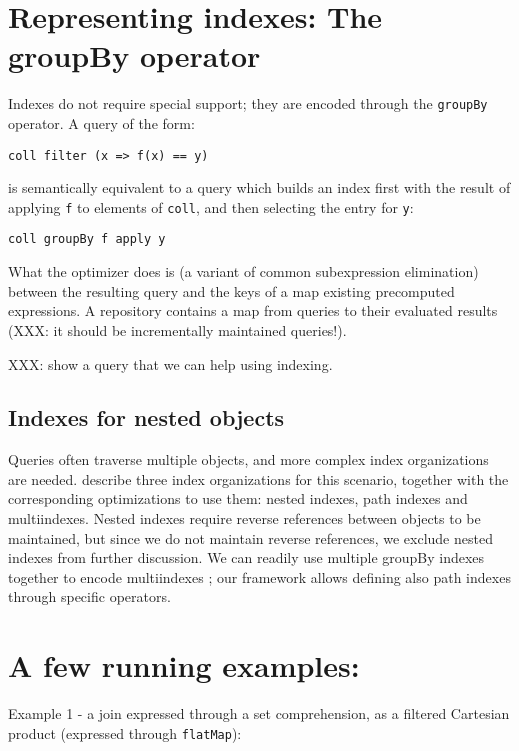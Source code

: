 \documentclass[preprint,authoryear,10pt]{sigplanconf}
\begin{document}
\section{Representing indexes: The groupBy operator}

Indexes do not require special support; they are encoded through the
\texttt{groupBy} operator. A query of the form:

\begin{verbatim}
coll filter (x => f(x) == y)
\end{verbatim}
is semantically equivalent to a query which builds an index first with
the result of applying \texttt{f} to elements of \texttt{coll}, and then
selecting the entry for \texttt{y}:

\begin{verbatim}
coll groupBy f apply y
\end{verbatim}
What the optimizer does is (a variant of common subexpression
elimination) between the resulting query and the keys of a map existing
precomputed expressions. A repository contains a map from queries to
their evaluated results (XXX: it should be incrementally maintained
queries!).

XXX: show a query that we can help using indexing.

\subsection{Indexes for nested objects}

Queries often traverse multiple objects, and more complex index
organizations are needed. \citet{Bertino89} describe three index
organizations for this scenario, together with the corresponding
optimizations to use them: nested indexes, path indexes and
multiindexes. Nested indexes require reverse references between objects
to be maintained, but since we do not maintain reverse references, we
exclude nested indexes from further discussion. We can readily use
multiple groupBy indexes together to encode multiindexes
\citep{Bertino89}; our framework allows defining also path indexes
through specific operators.

\section{A few running examples:}

Example 1 - a join expressed through a set comprehension, as a filtered
Cartesian product (expressed through \texttt{flatMap}):
\end{document}
